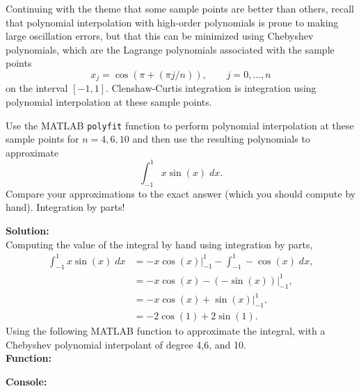 \documentclass[12pt]{article}
\makeatletter
\theoremstyle{homework}
\newenvironment{exercise}[1]
{\def\@currentlabel{#1}\exercisecore}
{\endexercisecore}
\newcommand{\localhead}[1]{\par\smallskip\noindent\textbf{#1}\nobreak\\}%
\newcommand\solution{\localhead{Solution:}}
\makeatother
\begin{document}
\begin{exercise}{Supplimental 1} Continuing with the theme that some sample points are better than others, recall that polynomial interpolation with high-order polynomials is prone to making large oscillation errors, but that this can be minimized
using Chebyshev polynomials, which are the Lagrange polynomials associated
with the sample points 
\[
x_j= \cos(\pi+(\pi j/n)),\qquad j=0,\ldots,n
\]
on the interval $[-1,1]$.
Clenshaw-Curtis integration is integration using polynomial interpolation at
these sample points.

Use the MATLAB \texttt{polyfit} function to perform polynomial
interpolation at these sample points for $n=4,6,10$ and then
use the resulting polynomials to approximate
\[
\int_{-1}^1 x\sin(x)\;dx.
\]
Compare your approximations to the exact answer (which you should
compute by hand).  Integration by parts!\\

\solution Computing the value of the integral by hand using integration by parts,
\begin{align*}
    \int_{-1}^1 x\sin(x)\;dx &=  -x\cos(x)|_{-1}^1 -\int_{-1}^1-\cos(x)\;dx,\\
     &=  -x\cos(x) - (-\sin(x))|_{-1}^1,\\
     &=  -x\cos(x) + \sin(x)|_{-1}^1,\\
     &= -2\cos(1)+2\sin(1).
\end{align*}
Using the following MATLAB function to approximate the integral, with a Chebyshev polynomial interpolant
of degree 4,6, and 10.\\
\textbf{Function:}
\begin{center}

\end{center}

\textbf{Console:}
\begin{center}

\end{center}


\end{exercise}
\vspace{.5in}
\end{document}
